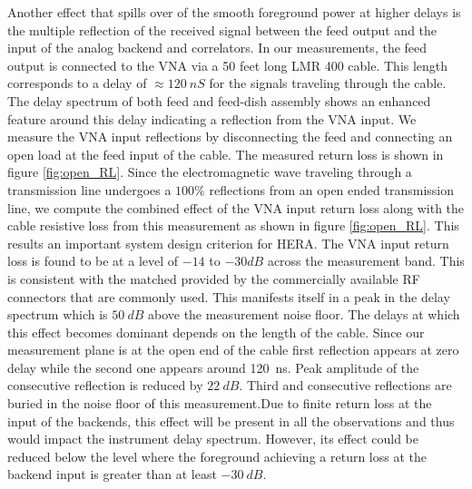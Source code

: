 \documentclass[twocolumn]{emulateapj}
\begin{document}
    Another effect that spills over of the smooth foreground power at higher delays
    is the multiple reflection of the received signal between the feed output and
    the input of the analog backend and correlators. In our measurements, the feed
    output is connected to the VNA via a 50 feet long LMR 400 cable. This length
    corresponds to a delay of $\approx 120~nS$ for the signals traveling through
    the cable. The delay spectrum of both feed and feed-dish assembly shows an
    enhanced feature around this delay indicating a reflection from the VNA input. We
    measure the VNA input reflections by disconnecting the feed and connecting an
    open load at the feed input of the cable. The measured return loss is shown in
    figure \ref{fig:open_RL}. Since the electromagnetic wave traveling through
    a transmission line undergoes a $100\%$ reflections from an open ended
    transmission line, we compute the combined effect of the VNA input return loss
    along with the cable resistive loss from this measurement as shown in figure
    \ref{fig:open_RL}. This results an important system design criterion for HERA.
    The VNA input return loss is found to be at a level of $-14$ to $-30dB$ across
    the measurement band. This is consistent with the matched provided by the
    commercially available RF connectors that are commonly used. This manifests
    itself in a peak in the delay spectrum which is $50~dB$ above the measurement
    noise floor. The delays at which this effect becomes dominant depends on the
    length of the cable. Since our measurement plane is at the open end of the cable
    first reflection appears at zero delay while the second one appears around 120~ns. 
    Peak amplitude of the consecutive reflection is reduced by $22~dB$. Third and 
    consecutive reflections are buried in the noise floor of this measurement.Due to 
    finite return loss at the input of the backends,
    this effect will be present in all the observations and thus would impact the
    instrument delay spectrum. However, its effect could be reduced below the level
    where the foreground  achieving a return loss at the backend input is greater
    than at least $-30~dB$. 
    
\end{document}
